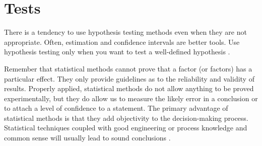 \chapter{Tests}
\label{chap:Tests}

\begin{tcolorbox}[colback=aliceblue!10!white,colframe=blue!70!black,title=\textbf{Remark}]
There is a tendency to use hypothesis testing methods even
when they are not appropriate. Often, estimation and confidence intervals are
better tools. Use hypothesis testing only when you want to test a well-defined
hypothesis \citep{wasserman2004all}.
\end{tcolorbox}


\begin{tcolorbox}[colback=aliceblue!10!white,colframe=green!90!black,title=\textbf{Remark}]
Remember that statistical methods cannot prove that a factor (or factors) has a particular effect. They only provide guidelines as to the reliability and validity of results.
Properly applied, statistical methods do not allow anything to be proved experimentally,
but they do allow us to measure the likely error in a conclusion or to attach a level of
confidence to a statement. The primary advantage of statistical methods is that they add
objectivity to the decision-making process. Statistical techniques coupled with good 
engineering or process knowledge and common sense will usually lead to sound
conclusions \citep{montgomery2017design}.
\end{tcolorbox}



